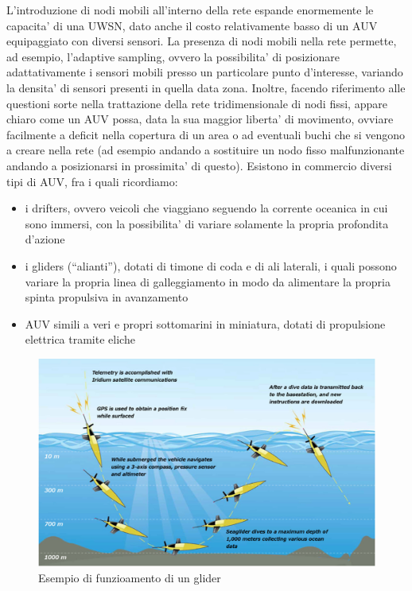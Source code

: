 \documentclass[Lau,binding=0.6cm]{sapthesis}
\begin{document}
L'introduzione di nodi mobili all'interno della rete espande enormemente le capacita' di una UWSN, dato anche il costo relativamente basso di un AUV equipaggiato con diversi sensori. La presenza di nodi mobili nella rete permette, ad esempio, l'adaptive sampling, ovvero la possibilita' di posizionare adattativamente i sensori mobili presso un particolare punto d'interesse, variando la densita' di sensori presenti in quella data zona. Inoltre, facendo riferimento alle questioni sorte nella trattazione della rete tridimensionale di nodi fissi, appare chiaro come un AUV possa, data la sua maggior liberta' di movimento, ovviare facilmente a deficit nella copertura di un area o ad eventuali buchi che si vengono a creare nella rete (ad esempio andando a sostituire un nodo fisso malfunzionante andando a posizionarsi in prossimita' di questo).
Esistono in commercio diversi tipi di AUV, fra i quali ricordiamo:
\begin{itemize}

\item i drifters, ovvero veicoli che viaggiano seguendo la corrente oceanica in cui sono immersi, con la possibilita' di variare solamente la propria
profondita d'azione

\item i gliders (``alianti''), dotati di timone di coda e di ali laterali, i quali possono variare la propria linea di galleggiamento in modo da alimentare la propria spinta propulsiva in avanzamento

\item AUV simili a veri e propri sottomarini in miniatura, dotati di propulsione elettrica tramite eliche

\end{itemize}
\begin{figure}[H]
    \centering
	\includegraphics[width=\linewidth]{glider.jpg}
	\caption{ Esempio di funzioamento di un glider}
	\label{fig:}
\end{figure}
\end{document}
